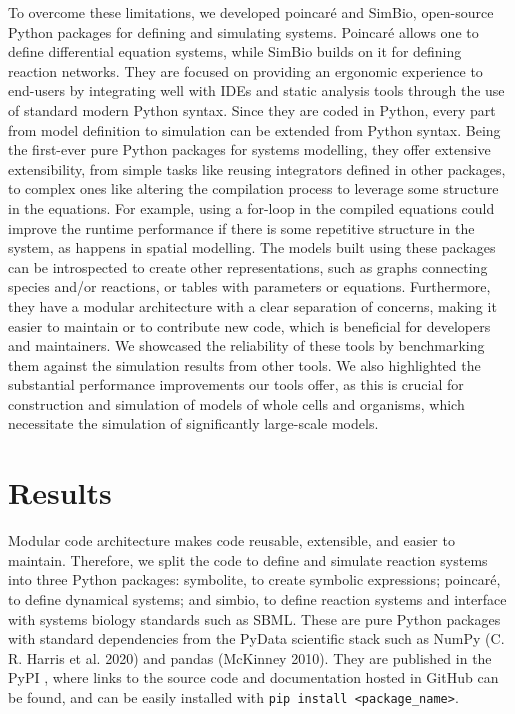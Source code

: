 \documentclass[
  letterpaper,
  DIV=11,
  numbers=noendperiod]{scrartcl}
\begin{document}
To overcome these limitations, we developed poincaré and SimBio,
open-source Python packages for defining and simulating systems.
Poincaré allows one to define differential equation systems, while SimBio
builds on it for defining reaction networks. They are focused on
providing an ergonomic experience to end-users by integrating well with
\acp{IDE} and static analysis tools through the use of standard modern Python
syntax. Since they are coded in Python, every part from model definition
to simulation can be extended from Python syntax. Being the first-ever
pure Python packages for systems modelling, they offer extensive
extensibility, from simple tasks like reusing integrators defined in
other packages, to complex ones like altering the compilation process to
leverage some structure in the equations. For example, using a for-loop
in the compiled equations could improve the runtime performance if there
is some repetitive structure in the system, as happens in spatial
modelling. The models built using these packages can be introspected to
create other representations, such as graphs connecting species and/or
reactions, or tables with parameters or equations. Furthermore, they
have a modular architecture with a clear separation of concerns, making
it easier to maintain or to contribute new code, which is beneficial for
developers and maintainers. We showcased the reliability of these tools
by benchmarking them against the simulation results from other tools. We
also highlighted the substantial performance improvements our tools
offer, as this is crucial for construction and simulation of models of
whole cells and organisms, which necessitate the simulation of
significantly large-scale models.

\hypertarget{results}{%
\section{Results}\label{results}}



Modular code architecture makes code reusable, extensible, and easier to
maintain. Therefore, we split the code to define and simulate reaction
systems into three Python packages: symbolite, to create symbolic
expressions; poincaré, to define dynamical systems; and simbio, to
define reaction systems and interface with systems biology standards
such as \ac{SBML}. These are pure Python packages with standard dependencies
from the PyData scientific stack such as NumPy (C. R. Harris et al.
2020) and pandas (McKinney 2010). They are published in the \acf{PyPI}
, where links to the source code and documentation hosted
in GitHub can be found, and can be easily installed with
\texttt{pip\ install\ \textless{}package\_name\textgreater{}}.
\end{document}
